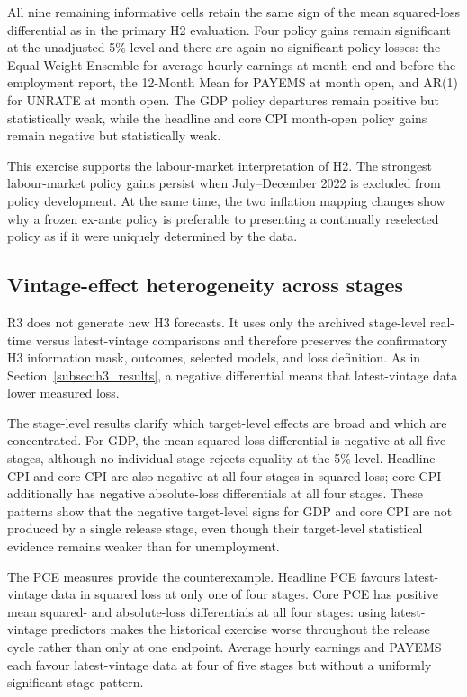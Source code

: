 All nine remaining informative cells retain the same sign of the mean
squared-loss differential as in the primary H2 evaluation. Four policy gains
remain significant at the unadjusted 5\% level and there are again no
significant policy losses: the Equal-Weight Ensemble for average hourly
earnings at month end and before the employment report, the 12-Month Mean for
PAYEMS at month open, and AR(1) for UNRATE at month open. The GDP policy
departures remain positive but statistically weak, while the headline and core
CPI month-open policy gains remain negative but statistically weak.

This exercise supports the labour-market interpretation of H2. The strongest
labour-market policy gains persist when July--December 2022 is excluded from
policy development. At the same time, the two inflation mapping changes show
why a frozen ex-ante policy is preferable to presenting a continually
reselected policy as if it were uniquely determined by the data.

\subsection{Vintage-effect heterogeneity across stages}
\label{subsec:h3_stage_heterogeneity}

R3 does not generate new H3 forecasts. It uses only the archived stage-level
real-time versus latest-vintage comparisons and therefore preserves the
confirmatory H3 information mask, outcomes, selected models, and loss
definition. As in Section~\ref{subsec:h3_results}, a negative differential
means that latest-vintage data lower measured loss.

The stage-level results clarify which target-level effects are broad and which
are concentrated. For GDP, the mean squared-loss differential is negative at
all five stages, although no individual stage rejects equality at the 5\%
level. Headline CPI and core CPI are also negative at all four stages in
squared loss; core CPI additionally has negative absolute-loss differentials
at all four stages. These patterns show that the negative target-level signs
for GDP and core CPI are not produced by a single release stage, even though
their target-level statistical evidence remains weaker than for
unemployment.

The PCE measures provide the counterexample. Headline PCE favours
latest-vintage data in squared loss at only one of four stages. Core PCE has
positive mean squared- and absolute-loss differentials at all four stages:
using latest-vintage predictors makes the historical exercise worse throughout
the release cycle rather than only at one endpoint. Average hourly earnings
and PAYEMS each favour latest-vintage data at four of five stages but without a
uniformly significant stage pattern.

